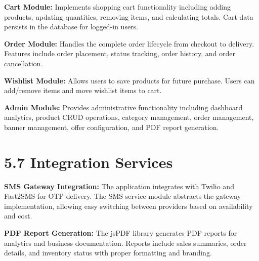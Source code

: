 \documentclass[12pt,a4paper]{report}
\begin{document}
\textbf{Cart Module:}
Implements shopping cart functionality including adding products, updating quantities, removing items, and calculating totals. Cart data persists in the database for logged-in users.

\textbf{Order Module:}
Handles the complete order lifecycle from checkout to delivery. Features include order placement, status tracking, order history, and order cancellation.

\textbf{Wishlist Module:}
Allows users to save products for future purchase. Users can add/remove items and move wishlist items to cart.

\textbf{Admin Module:}
Provides administrative functionality including dashboard analytics, product CRUD operations, category management, order management, banner management, offer configuration, and PDF report generation.

\section*{5.7 Integration Services}

\textbf{SMS Gateway Integration:}
The application integrates with Twilio and Fast2SMS for OTP delivery. The SMS service module abstracts the gateway implementation, allowing easy switching between providers based on availability and cost.

\textbf{PDF Report Generation:}
The jsPDF library generates PDF reports for analytics and business documentation. Reports include sales summaries, order details, and inventory status with proper formatting and branding.
\end{document}
